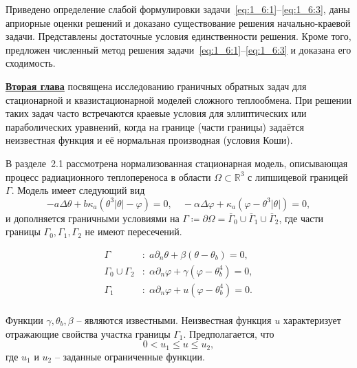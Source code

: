 Приведено определение слабой формулировки задачи~\eqref{eq:1_6:1}--\eqref{eq:1_6:3},
даны априорные оценки решений и доказано существование решения начально-краевой задачи.
Представлены достаточные условия единственности решения.
Кроме того, предложен численный метод решения задачи~\eqref{eq:1_6:1}--\eqref{eq:1_6:3}
и доказана его сходимость.


\underline{\textbf{Вторая глава}} посвящена исследованию граничных обратных задач для
стационарной и квазистационарной моделей сложного теплообмена.
При решении таких задач часто встречаются краевые условия для
эллиптических или параболических уравнений,
когда на границе (части границы) задаётся неизвестная функция
и её нормальная производная (условия Коши).


В разделе~2.1 рассмотрена нормализованная стационарная модель,
описывающая процесс радиационного теплопереноса в
области $\Omega \subset \mathbb{R}^3$ с липшицевой границей $\Gamma$.
Модель имеет следующий вид
\begin{equation}
    \label{eq:2_1:initial}
    - a \Delta \theta + b \kappa_a(\theta ^ 3 | \theta | - \varphi) = 0,  \quad
    - \alpha \Delta \varphi + \kappa_a (\varphi - \theta ^3 | \theta |) = 0,
\end{equation}
и дополняется граничными условиями на
$\Gamma \coloneqq \partial \Omega =\overline{\Gamma}_0 \cup \overline{\Gamma}_1 \cup \overline{\Gamma}_2$,
где части границы $\Gamma_0, \Gamma_1, \Gamma_2$ не имеют пересечений.

\begin{equation}
    \label{eq:2_1:initial-boundary}
    \begin{aligned}
        \Gamma &: \; a \partial_n \theta + \beta (\theta - \theta _b) = 0, \\
        \Gamma_0 \cup \Gamma_2 &: \; \alpha \partial_n \varphi
        + \gamma(\varphi - \theta_b ^4 ) = 0, \\
        \Gamma_1 &: \; \alpha \partial_n \varphi + u(\varphi - \theta_b ^4 ) = 0. \\
    \end{aligned}
\end{equation}


Функции $\gamma, \theta_b, \beta$ -- являются известными.
Неизвестная функция $u$ характеризует отражающие свойства участка границы $\Gamma_1$.
Предполагается, что
\begin{equation}
    \label{eq:2_1:control_bounds}
    0 < u_1 \leq u \leq u_2,
\end{equation}
где $u_1$ и $u_2$ -- заданные ограниченные функции.


